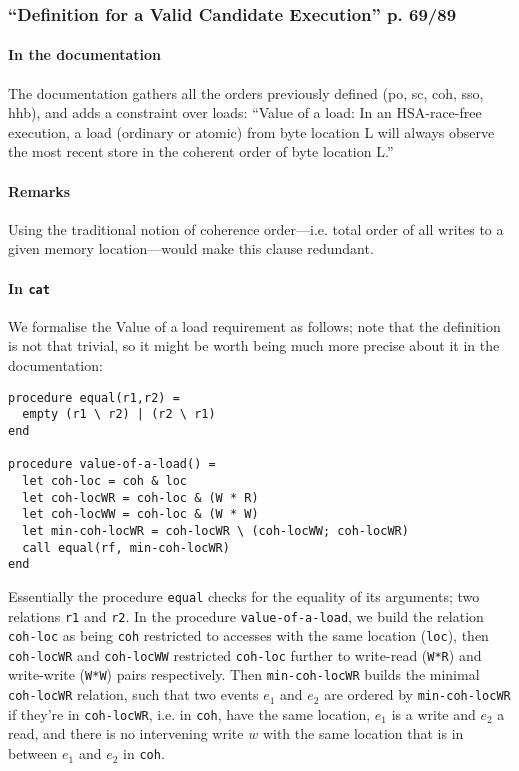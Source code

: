 \documentclass[a4paper]{article}
\begin{document}
\subsubsection{``Definition for a Valid Candidate Execution'' p. 69/89 \label{sec:value}}

\paragraph{In the documentation}
The documentation gathers all the orders previously defined (po, sc, coh, sso,
hhb), and adds a constraint over loads: ``Value of a load: In an HSA-race-free
execution, a load (ordinary or atomic) from byte location L will always observe
the most recent store in the coherent order of byte location L.''

\paragraph{Remarks}
Using the traditional notion of coherence order---i.e. total order of all
writes to a given memory location---would make this clause redundant.

\paragraph{In {\tt cat}}

We formalise the Value of a load requirement as follows; note that the
definition is not that trivial, so it might be worth being much more precise
about it in the documentation:
\begin{verbatim}
procedure equal(r1,r2) =
  empty (r1 \ r2) | (r2 \ r1)
end

procedure value-of-a-load() =
  let coh-loc = coh & loc
  let coh-locWR = coh-loc & (W * R)
  let coh-locWW = coh-loc & (W * W)
  let min-coh-locWR = coh-locWR \ (coh-locWW; coh-locWR)
  call equal(rf, min-coh-locWR)
end
\end{verbatim} 

Essentially the procedure {\tt equal} checks for the equality of its arguments; two relations {\tt r1} and {\tt r2}. In the procedure {\tt value-of-a-load}, we build the relation {\tt coh-loc} as being {\tt coh} restricted to accesses with the same location ({\tt loc}), then {\tt coh-locWR} and {\tt coh-locWW} restricted {\tt coh-loc} further to write-read ({\tt W*R}) and write-write ({\tt W*W}) pairs respectively. Then {\tt min-coh-locWR} builds the minimal {\tt coh-locWR} relation, such that two events $e_1$ and $e_2$ are ordered by {\tt min-coh-locWR} if they're in {\tt coh-locWR}, i.e. in {\tt coh}, have the same location, $e_1$
is a write and $e_2$ a read, and there is no intervening write $w$ with the
same location that is in between $e_1$ and $e_2$ in {\tt coh}.
\end{document}
